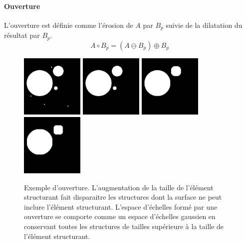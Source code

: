\paragraph{Ouverture}
L'ouverture est définie comme l'érosion de $A$ par $B_p$ suivie de la dilatation du résultat par $B_p$.
\begin{equation}
 A \circ B_p = (A \ominus B_p) \oplus B_p
\end{equation}
\begin{figure}[!ht]
  \centering
  \includegraphics[height=3cm]{Images/morpho_init.png}
  \includegraphics[height=3cm]{Images/morpho_open_k5.png}
  \includegraphics[height=3cm]{Images/morpho_open_k21.png}
  \includegraphics[height=3cm]{Images/morpho_open_k31.png}
  \caption{Exemple d'ouverture. L'augmentation de la taille de l'élément structurant fait disparaitre les structures dont la surface ne peut inclure l'élément structurant. L'espace d'échelles formé par une ouverture se comporte comme un espace d'échelles gaussien en conservant toutes les structures de tailles supérieure à la taille de l'élément structurant. }
  \label{fig:morpho_ouverture}
\end{figure}

